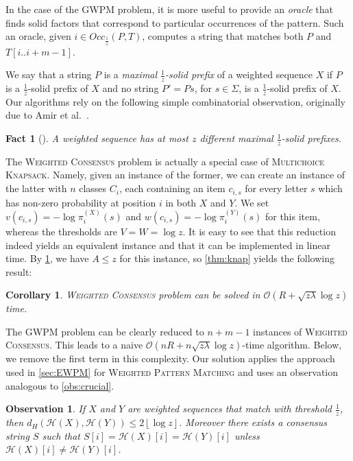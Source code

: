 \documentclass{article}
\theoremstyle{plain}
\newtheorem{corollary}[theorem]{Corollary}
\newtheorem{fact}[theorem]{Fact}
\newtheorem{observation}[theorem]{Observation}
\theoremstyle{definition}
\newcommand{\MK}{\textsc{Multichoice Knapsack}\xspace}
\newcommand{\WPM}{\textsc{Weighted Pattern Matching}\xspace}
\newcommand{\GWPM}{\textsc{GWPM}\xspace}
\newcommand{\WC}{\textsc{Weighted Consensus}\xspace}
\newcommand{\floor}[1]{\left\lfloor #1 \right\rfloor}
\newcommand{\Oh}{\mathcal{O}}
\newcommand{\Occ}{\mathit{Occ}}
\renewcommand{\H}{\mathcal{H}}
\newcommand{\fr}{\ensuremath{\frac1z}}
\newcommand{\HammingDistance}{d_H}
\begin{document}
    In the case of the \GWPM problem, it is more useful to provide an \emph{oracle} that finds solid factors that correspond to particular occurrences of the pattern.
    Such an oracle, given $i \in \Occ_\fr(P,T)$, computes a string that matches both $P$ and $T[i..i+m-1]$.




    We say that a string $P$ is a \emph{maximal \fr-solid prefix} of a weighted sequence $X$
    if $P$ is a \fr-solid prefix of $X$ and no string $P' = Ps$, for $s \in \Sigma$, is a \fr-solid prefix of $X$.
    Our algorithms rely on the following simple combinatorial observation, originally due to Amir et al.\ \cite{amir_weighted_property_matching_j}.

    \begin{fact}[\cite{amir_weighted_property_matching_j}]\label{fct:maxprefixes}
      A weighted sequence has at most $z$ different maximal \fr-solid prefixes.
    \end{fact}


    The \WC problem is actually a special case of \MK.
    Namely, given an instance of the former, we can create an instance of the latter with $n$ classes $C_i$,
    each containing an item $c_{i,s}$ for every letter $s$ which has non-zero probability at position $i$ in both $X$ and $Y$.
    We set $v(c_{i,s})=-\log \pi^{(X)}_i(s)$ and $w(c_{i,s})=-\log \pi^{(Y)}_i(s)$ for this item,
    whereas the thresholds are $V=W=\log z$. It is easy to see that this reduction indeed yields an equivalent instance
    and that it can be implemented in linear time.
    By \cref{fct:maxprefixes}, we have $A\le z$ for this instance, so \cref{thm:knap} yields the following result:
    \begin{corollary}\label{cor:red_simple}
    \WC problem can be solved in $\Oh(R+\sqrt{z\lambda}\log z)$ time.
    \end{corollary}
    
    The \GWPM problem can be clearly reduced to $n+m-1$ instances of \WC. 
    This leads to a naive $\Oh(nR + n\sqrt{z\lambda}\log z)$-time algorithm.
    Below, we remove the first term in this complexity. 
    Our solution applies the approach used in \cref{sec:EWPM} for \WPM and uses an observation
    analogous to \cref{obs:crucial}.
    
    \begin{observation}\label{obs:crucial2}
      If $X$ and $Y$ are weighted sequences that match with threshold $\fr$,
      then $\HammingDistance(\H(X),\H(Y)) \le 2\floor{\log z}$.
      Moreover there exists a consensus string $S$ such that $S[i] = \H(X)[i] = \H(Y)[i]$ unless $\H(X)[i]\ne \H(Y)[i]$.
    \end{observation}
 
\end{document}
